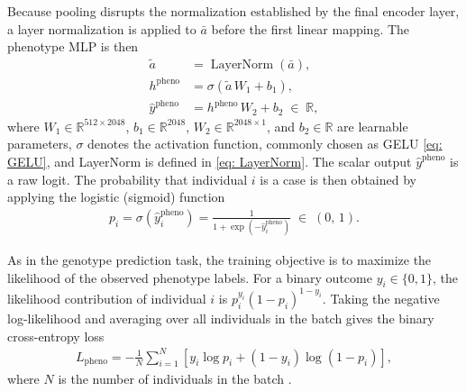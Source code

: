 Because pooling disrupts the normalization established by the final encoder
layer, a layer normalization is applied to $\bar{a}$ before the first linear
mapping. The phenotype MLP is then
\begin{align*}
    \tilde{a} &= \operatorname{LayerNorm}(\bar{a}), \\
    h^{\mathrm{pheno}} &= \sigma(\tilde{a}\, W_1 + b_1), \\
    \hat{y}^{\mathrm{pheno}} &= h^{\mathrm{pheno}}\, W_2 + b_2
      \;\in\; \mathbb{R},
\end{align*}
where $W_1 \in \mathbb{R}^{512 \times 2048}$,
$b_1 \in \mathbb{R}^{2048}$,
$W_2 \in \mathbb{R}^{2048 \times 1}$, and
$b_2 \in \mathbb{R}$ are learnable parameters, $\sigma$ denotes the activation function, commonly chosen as GELU \eqref{eq: GELU}, and LayerNorm is defined in \eqref{eq: LayerNorm}. The scalar output $\hat{y}^{\mathrm{pheno}}$ is a raw logit. The probability that individual $i$ is a case is then obtained by applying the logistic (sigmoid) function
\begin{align*}
    p_i = \sigma(\hat{y}^{\mathrm{pheno}}_i)
    = \frac{1}{1 + \exp(-\hat{y}^{\mathrm{pheno}}_i)}
    \;\in\; (0,\, 1).
\end{align*}

As in the genotype prediction task, the training objective is to maximize
the likelihood of the observed phenotype labels. For a binary outcome $y_i \in \{0, 1\}$, the likelihood contribution of individual $i$ is $p_i^{y_i}(1 - p_i)^{1 - y_i}$. Taking the negative log-likelihood and averaging over all individuals in the batch gives the binary cross-entropy loss
\begin{align}
\label{eq: BCE loss}
L_{\mathrm{pheno}} = -\frac{1}{N} \sum_{i=1}^{N} \left[y_i \log p_i + (1 - y_i) \log(1- p_i)\right],
\end{align}
where $N$ is the number of individuals in the batch
\citep{PyTorchBCEWithLogitsLoss}.

